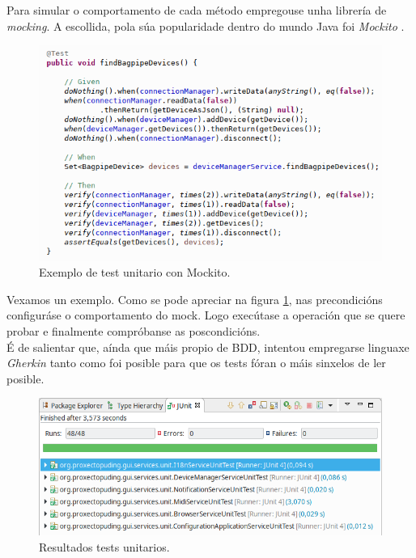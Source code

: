   Para simular o comportamento de cada método empregouse unha librería de
  \textit{mocking}. A escollida, pola súa popularidade dentro do mundo Java foi
  \textit{Mockito} \cite{Mockito}. \\
  
  \begin{figure}[htbp]
   \centering
   \includegraphics[scale=0.8,keepaspectratio=true]{./imagenes/test-mockito.png}
   \caption{Exemplo de test unitario con Mockito.}
   \label{figura:TestMockito}
  \end{figure}
  
  Vexamos un exemplo. Como se pode apreciar na figura \ref{figura:TestMockito},
  nas precondicións configuráse o comportamento do mock. Logo execútase a
  operación que se quere probar e finalmente compróbanse as poscondicións. \\
  
  É de salientar que, aínda que máis propio de BDD, intentou empregarse linguaxe
  \textit{Gherkin} \cite{Gherkin} tanto como foi posible para que os tests fóran
  o máis sinxelos de ler posible. \\
  
  \begin{figure}[htbp]
   \centering
   \includegraphics[scale=0.8,keepaspectratio=true]{./imagenes/resultados-tests-unitarios.png}
   \caption{Resultados tests unitarios.}
   \label{figura:ResultadosTestUnitarios}
  \end{figure}
  
